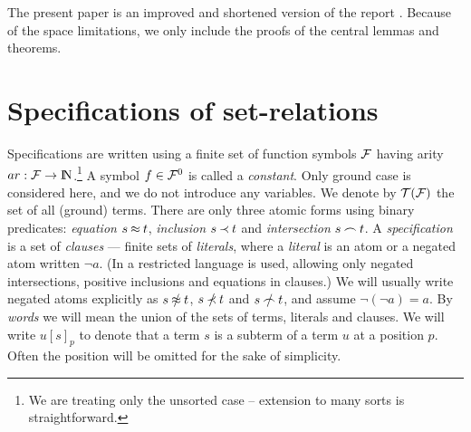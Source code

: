 The present paper is an improved and shortened version of the report \cite{KW}.
Because of the space limitations, we only include the proofs of the central 
lemmas and theorems.

\section{Specifications of set-relations} \label{se:nd-specs}

Specifications are written using a finite set of function symbols ${\cal F}$
having arity $ar:{\cal F}\to {{\rm I\hspace{-.2em}N}}$.\footnote
{We are treating only the unsorted case --
extension to many sorts is straightforward.}
A symbol $f\in{\cal F}^0$ %
is called a {\em constant}.  Only ground case is considered here, and we do not
introduce any variables.  We denote by ${\cal T}({\cal F})$ the set of all (ground)
terms.  There are only three atomic forms using binary predicates: {\em
equation} $s\mathbin{\approx} t$, {\em inclusion} $s\mathbin{\prec} t$ and {\em intersection} $s\mathbin{\frown}
t$. A {\em specification} is a set of {\em clauses}
--- finite sets of {\em
literals}, where a {\em literal} is an atom or a negated atom written \(\neg 
a\).
 (In \cite{MW,Mich} a 
restricted language is used, allowing only negated intersections, positive 
inclusions and equations in clauses.) We will usually write negated atoms 
explicitly as $s\notEq t$, $s\notIncl t$ and $s\notInt t$, and 
assume \(\neg(\neg a)=a\).
%
By
{\em words} we will mean the union of the sets of terms, literals and
clauses.  We will write $u[s]_p$ to denote that a term $s$ is a subterm of a
term $u$ at a position $p$. Often the position will be omitted for the sake of
simplicity.
%

